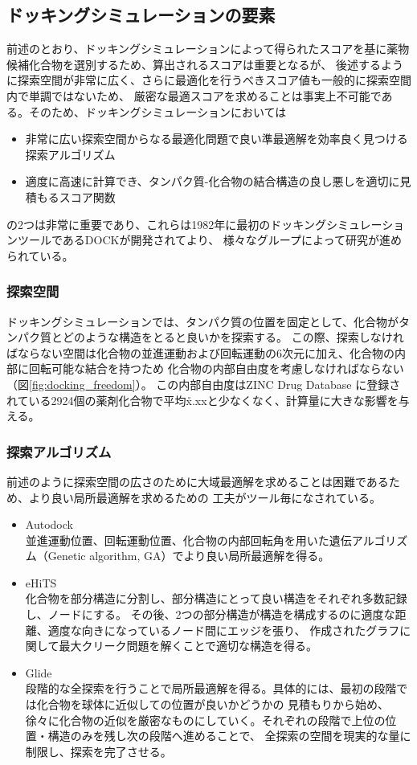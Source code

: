 \subsection{ドッキングシミュレーションの要素}
前述のとおり、ドッキングシミュレーションによって得られたスコアを基に薬物候補化合物を選別するため、算出されるスコアは重要となるが、
後述するように探索空間が非常に広く、さらに最適化を行うべきスコア値も一般的に探索空間内で単調ではないため、
厳密な最適スコアを求めることは事実上不可能である。そのため、ドッキングシミュレーションにおいては
\begin{itemize}
\item 非常に広い探索空間からなる最適化問題で良い準最適解を効率良く見つける探索アルゴリズム
\item 適度に高速に計算でき、タンパク質-化合物の結合構造の良し悪しを適切に見積もるスコア関数
\end{itemize}
の2つは非常に重要であり、これらは1982年に最初のドッキングシミュレーションツールであるDOCK\citetodo{}が開発されてより、
様々なグループによって研究が進められている。

\subsubsection{探索空間}
ドッキングシミュレーションでは、タンパク質の位置を固定として、化合物がタンパク質とどのような構造をとると良いかを探索する。
この際、探索しなければならない空間は化合物の並進運動および回転運動の6次元に加え、化合物の内部に回転可能な結合を持つため
化合物の内部自由度を考慮しなければならない（図\ref{fig:docking_freedom}）。
この内部自由度はZINC Drug Database に登録されている2924個の薬剤化合物で平均\r{x.xx}と少なくなく、計算量に大きな影響を与える。

\subsubsection{探索アルゴリズム}
前述のように探索空間の広さのために大域最適解を求めることは困難であるため、より良い局所最適解を求めるための
工夫がツール毎になされている。
\begin{itemize}
\item Autodock\\
	並進運動位置、回転運動位置、化合物の内部回転角を用いた遺伝アルゴリズム（Genetic algorithm, GA）でより良い局所最適解を得る。
\item eHiTS\\
	化合物を部分構造に分割し、部分構造にとって良い構造をそれぞれ多数記録し、ノードにする。
	その後、2つの部分構造が構造を構成するのに適度な距離、適度な向きになっているノード間にエッジを張り、
	作成されたグラフに関して最大クリーク問題を解くことで適切な構造を得る。
\item Glide\\
	段階的な全探索を行うことで局所最適解を得る。具体的には、最初の段階では化合物を球体に近似しての位置が良いかどうかの
	見積もりから始め、徐々に化合物の近似を厳密なものにしていく。それぞれの段階で上位の位置・構造のみを残し次の段階へ進めることで、
	全探索の空間を現実的な量に制限し、探索を完了させる。
\end{itemize}

